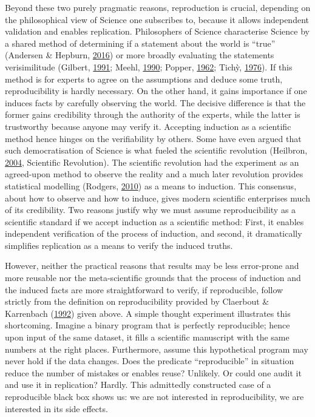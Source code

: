 \documentclass[12pt,a4paper,]{article}
\begin{document}
Beyond these two purely pragmatic reasons, reproduction is crucial, depending on the philosophical view of Science one subscribes to, because it allows independent validation and enables replication.
Philosophers of Science characterise Science by a shared method of determining if a statement about the world is ``true'' (Andersen \& Hepburn, \protect\hyperlink{ref-andersonScientificMethod2016}{2016}) or more broadly evaluating the statements verisimilitude (Gilbert, \protect\hyperlink{ref-gilbertModelBuildingDefinition1991}{1991}; Meehl, \protect\hyperlink{ref-meehlAppraisingAmendingTheories1990}{1990}; Popper, \protect\hyperlink{ref-popperCommentsTruthGrowth1962}{1962}; Tichỳ, \protect\hyperlink{ref-tichyVerisimilitudeRedefined1976}{1976}).
If this method is for experts to agree on the assumptions and deduce some truth, reproducibility is hardly necessary.
On the other hand, it gains importance if one induces facts by carefully observing the world.
The decisive difference is that the former gains credibility through the authority of the experts, while the latter is trustworthy because anyone may verify it.
Accepting induction as a scientific method hence hinges on the verifiability by others.
Some have even argued that such democratisation of Science is what fueled the scientific revolution (Heilbron, \protect\hyperlink{ref-heilbronOxfordCompanionHistory2004}{2004}, Scientific Revolution).
The scientific revolution had the experiment as an agreed-upon method to observe the reality and a much later revolution provides statistical modelling (Rodgers, \protect\hyperlink{ref-rodgersEpistemologyMathematicalStatistical2010}{2010}) as a means to induction.
This consensus, about how to observe and how to induce, gives modern scientific enterprises much of its credibility.
Two reasons justify why we must assume reproducibility as a scientific standard if we accept induction as a scientific method:
First, it enables independent verification of the process of induction, and second, it dramatically simplifies replication as a means to verify the induced truths.

However, neither the practical reasons that results may be less error-prone and more reusable nor the meta-scientific grounds that the process of induction and the induced facts are more straightforward to verify, if reproducible, follow strictly from the definition on reproducibility provided by Claerbout \& Karrenbach (\protect\hyperlink{ref-claerboutElectronicDocumentsGive1992}{1992}) given above.
A simple thought experiment illustrates this shortcoming.
Imagine a binary program that is perfectly reproducible; hence upon input of the same dataset, it fills a scientific manuscript with the same numbers at the right places. Furthermore, assume this hypothetical program may never hold if the data changes.
Does the predicate ``reproducible'' in situation reduce the number of mistakes or enables reuse? Unlikely.
Or could one audit it and use it in replication? Hardly.
This admittedly constructed case of a reproducible black box shows us: we are not interested in reproducibility, we are interested in its side effects.
\end{document}
